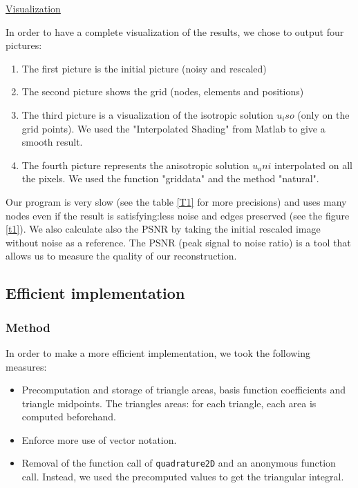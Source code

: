 \documentclass{report}
\begin{document}
\underline{Visualization} 


In order to have a complete visualization of the results, we chose to output four pictures: 
\begin{enumerate}
\item 
The first picture is the initial picture (noisy and rescaled)
\item
The second picture shows the grid (nodes, elements and positions)
\item
The third picture is a visualization of the isotropic solution $u_iso$ (only on the grid points). We used the "Interpolated Shading" from Matlab to give a smooth result. 
\item
The fourth picture represents the anisotropic solution $u_ani$ interpolated on all the pixels. We used the function "griddata" and the method "natural". 
\end{enumerate}




Our program is very slow (see the table \ref{T1} for more precisions) and uses many nodes even if the result is satisfying:less noise and edges preserved (see the figure \ref{t1}). We also calculate also the PSNR by taking the initial rescaled image without noise as a reference. The PSNR (peak signal to noise ratio) is a tool that allows us to measure the quality of our reconstruction. 





\subsection{Efficient implementation}

\subsubsection{Method}

In order to make a more efficient implementation, we took the following measures:

\begin{itemize}
    \item
    Precomputation and storage of triangle areas, basis function coefficients and triangle midpoints.
    The triangles areas: for each triangle, each area is computed beforehand. 
    \item 
    Enforce more use of vector notation.
    \item 
    Removal of the function call of \texttt{quadrature2D} and an anonymous function call. Instead, we used the precomputed values to get the triangular integral.
\end{itemize}
\end{document}
